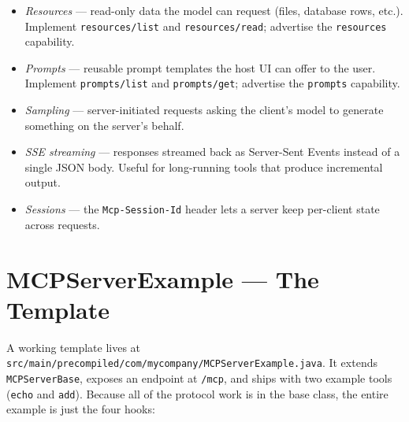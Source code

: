 \begin{itemize}
  \item \emph{Resources} --- read-only data the model can request (files, database rows, etc.).  Implement \texttt{resources/list} and \texttt{resources/read}; advertise the \texttt{resources} capability.
  \item \emph{Prompts} --- reusable prompt templates the host UI can offer to the user.  Implement \texttt{prompts/list} and \texttt{prompts/get}; advertise the \texttt{prompts} capability.
  \item \emph{Sampling} --- server-initiated requests asking the client's model to generate something on the server's behalf.
  \item \emph{SSE streaming} --- responses streamed back as Server-Sent Events instead of a single JSON body.  Useful for long-running tools that produce incremental output.
  \item \emph{Sessions} --- the \texttt{Mcp-Session-Id} header lets a server keep per-client state across requests.
\end{itemize}

\section{MCPServerExample --- The Template}
\label{sec:ext-mcpserverexample}

A working template lives at \texttt{src/main/precom\-piled/com/mycompany/MCPServer\-Example.java}.  It extends \texttt{MCPServerBase}, exposes an endpoint at \texttt{/mcp}, and ships with two example tools (\texttt{echo} and \texttt{add}).  Because all of the protocol work is in the base class, the entire example is just the four hooks:

